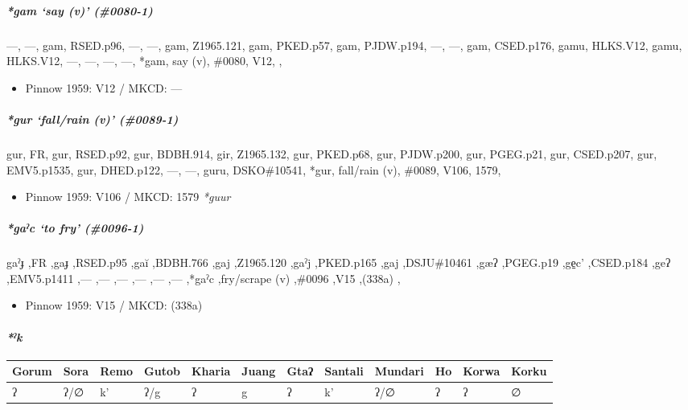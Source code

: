 \documentclass[a4paper,]{article}
\providecommand{\tightlist}{%
  \setlength{\itemsep}{0pt}\setlength{\parskip}{0pt}}
\let\oldparagraph\paragraph
\renewcommand{\paragraph}[1]{\oldparagraph{#1}\mbox{}}
\let\oldsubparagraph\subparagraph
\renewcommand{\subparagraph}[1]{\oldsubparagraph{#1}\mbox{}}
\begin{document}
\subparagraph{\texorpdfstring{\emph{*gam} `say (v)'
(\#0080-1)}{*gam say (v) (\#0080-1)}}\label{gam-say-v-0080-1}

---, ---, gam, RSED.p96, ---, ---, gam, Z1965.121, gam, PKED.p57, gam,
PJDW.p194, ---, ---, gam, CSED.p176, gamu, HLKS.V12, gamu, HLKS.V12,
---, ---, ---, ---, *gam, say (v), \#0080, V12, ,

\begin{itemize}
\tightlist
\item
  Pinnow 1959: V12 / MKCD: ---
\end{itemize}

\subparagraph{\texorpdfstring{\emph{*gur} `fall/rain (v)'
(\#0089-1)}{*gur fall/rain (v) (\#0089-1)}}\label{gur-fallrain-v-0089-1}

gur, FR, gur, RSED.p92, gur, BDBH.914, gir, Z1965.132, gur, PKED.p68,
gur, PJDW.p200, gur, PGEG.p21, gur, CSED.p207, gur, EMV5.p1535, gur,
DHED.p122, ---, ---, guru, DSKO\#10541, *gur, fall/rain (v), \#0089,
V106, 1579,

\begin{itemize}
\tightlist
\item
  Pinnow 1959: V106 / MKCD: 1579 \emph{*guur}
\end{itemize}

\subparagraph{\texorpdfstring{\emph{*gaˀc} `to fry'
(\#0096-1)}{*gaˀc to fry (\#0096-1)}}\label{gaux2c0c-to-fry-0096-1}

gaˀɟ ,FR ,gaɟ ,RSED.p95 ,gaĭ ,BDBH.766 ,gaj ,Z1965.120 ,gaˀj ,PKED.p165
,gaj ,DSJU\#10461 ,gæʔ ,PGEG.p19 ,ge̠c' ,CSED.p184 ,geʔ ,EMV5.p1411 ,---
,--- ,--- ,--- ,--- ,--- ,*gaˀc ,fry/scrape (v) ,\#0096 ,V15 ,(338a) ,

\begin{itemize}
\tightlist
\item
  Pinnow 1959: V15 / MKCD: (338a)
\end{itemize}

\paragraph{\texorpdfstring{\emph{*ˀk}}{*ˀk}}\label{ux2c0k}

\begin{longtable}[]{@{}llllllllllll@{}}
\toprule
Gorum & Sora & Remo & Gutob & Kharia & Juang & Gtaʔ & Santali & Mundari
& Ho & Korwa & Korku\tabularnewline
\midrule
\endhead
ʔ & ʔ/∅ & k' & ʔ/g & ʔ & g & ʔ & k' & ʔ/∅ & ʔ & ʔ & ∅\tabularnewline
\bottomrule
\end{longtable}
\end{document}
